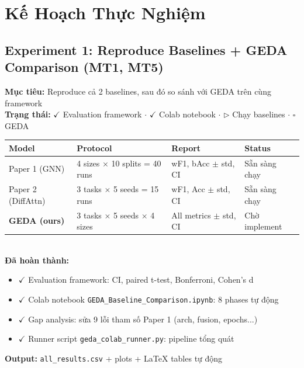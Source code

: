 \documentclass[12pt,a4paper]{article}
\begin{document}
\section{Kế Hoạch Thực Nghiệm}

\subsection{Experiment 1: Reproduce Baselines + GEDA Comparison (MT1, MT5)}

\begin{taskbox}
\textbf{Mục tiêu:} Reproduce cả 2 baselines, sau đó so sánh với GEDA trên cùng framework\\
\textbf{Trạng thái:} \textcolor{done}{$\checkmark$ Evaluation framework} $\cdot$ \textcolor{done}{$\checkmark$ Colab notebook} $\cdot$ \textcolor{inprog}{$\triangleright$ Chạy baselines} $\cdot$ \textcolor{todo}{$\square$ GEDA}\\[0.3cm]
\begin{tabular}{llll}
\toprule
\textbf{Model} & \textbf{Protocol} & \textbf{Report} & \textbf{Status} \\
\midrule
Paper 1 (GNN) & 4 sizes $\times$ 10 splits = 40 runs & wF1, bAcc $\pm$ std, CI & \textcolor{inprog}{Sẵn sàng chạy} \\
Paper 2 (DiffAttn) & 3 tasks $\times$ 5 seeds = 15 runs & wF1, Acc $\pm$ std, CI & \textcolor{inprog}{Sẵn sàng chạy} \\
\textbf{GEDA (ours)} & 3 tasks $\times$ 5 seeds $\times$ 4 sizes & All metrics $\pm$ std, CI & \textcolor{todo}{Chờ implement} \\
\bottomrule
\end{tabular}
\\[0.3cm]
\textbf{Đã hoàn thành:}
\begin{itemize}[nosep]
  \item \textcolor{done}{$\checkmark$} Evaluation framework: CI, paired t-test, Bonferroni, Cohen's d
  \item \textcolor{done}{$\checkmark$} Colab notebook \texttt{GEDA\_Baseline\_Comparison.ipynb}: 8 phases tự động
  \item \textcolor{done}{$\checkmark$} Gap analysis: sửa 9 lỗi tham số Paper 1 (arch, fusion, epochs...)
  \item \textcolor{done}{$\checkmark$} Runner script \texttt{geda\_colab\_runner.py}: pipeline tổng quát
\end{itemize}
\textbf{Output:} \texttt{all\_results.csv} + plots + LaTeX tables tự động
\end{taskbox}
\end{document}

